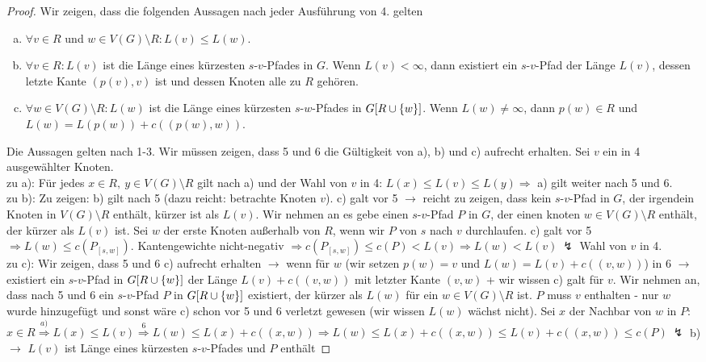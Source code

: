 \begin{proof}
	Wir zeigen, dass die folgenden Aussagen nach jeder Ausführung von 4. gelten
	\begin{enumerate}[a)]
		\item $\forall v\in R$ und $w\in V(G)\setminus R: L(v) \le L(w)$.
		\item $\forall v\in R: L(v)$ ist die Länge eines kürzesten $s$-$v$-Pfades in $G$. Wenn $L(v) < \infty$, dann existiert ein $s$-$v$-Pfad der Länge $L(v)$, dessen letzte Kante $(p(v), v)$ ist und dessen Knoten alle zu $R$ gehören.
		\item $\forall w\in V(G)\setminus R: L(w)$ ist die Länge eines kürzesten $s$-$w$-Pfades in $G[R\cup \{w\}]$. Wenn $L(w) \neq \infty$, dann $p(w)\in R$ und $L(w) = L(p(w)) + c((p(w),w))$.
	\end{enumerate}
	Die Aussagen gelten nach 1-3. Wir müssen zeigen, dass 5 und 6 die Gültigkeit von a), b) und c) aufrecht erhalten. Sei $v$ ein in 4 ausgewählter Knoten.\\
	zu a): Für jedes $x \in R,~y\in V(G)\setminus R$ gilt nach a) und der Wahl von $v$ in 4: $L(x) \le L(v) \le L(y) \Rightarrow$ a) gilt weiter nach 5 und 6.\\
	zu b): Zu zeigen: b) gilt nach 5 (dazu reicht: betrachte Knoten $v$). c) galt vor 5 $\to$ reicht zu zeigen, dass kein $s$-$v$-Pfad in $G$, der irgendein Knoten in $V(G)\setminus R$ enthält, kürzer ist als $L(v)$. Wir nehmen an es gebe einen $s$-$v$-Pfad $P$ in $G$, der einen knoten $w \in V(G)\setminus R$ enthält, der kürzer als $L(v)$ ist. Sei $w$ der erste Knoten außerhalb von $R$, wenn wir $P$ von $s$ nach $v$ durchlaufen. c) galt vor 5 $\Rightarrow L(w) \le c(P_{[s,w]})$. Kantengewichte nicht-negativ $\Rightarrow c(P_{[s,w]}) \le c(P) < L(v) \Rightarrow L(w) < L(v)~ \lightning$ Wahl von $v$ in 4.\\
	zu c): Wir zeigen, dass 5 und 6 c) aufrecht erhalten $\to$ wenn für $w$ (wir setzen $p(w) = v$ und $L(w) = L(v) + c((v,w))$) in 6 $\to$ existiert ein $s$-$v$-Pfad in $G[R \cup \{w\}]$ der Länge $L(v) + c((v,w))$ mit letzter Kante $(v,w)$ + wir wissen c) galt für $v$. Wir nehmen an, dass nach 5 und 6 ein $s$-$v$-Pfad $P$ in $G[R \cup \{w\}]$ existiert, der kürzer als $L(w)$ für ein $w\in V(G)\setminus R$ ist. $P$ muss $v$ enthalten - nur $w$ wurde hinzugefügt und sonst wäre c) schon vor 5 und 6 verletzt gewesen (wir wissen $L(w)$ wächst nicht). Sei $x$ der Nachbar von $w$ in $P$: $x \in R \overset{a)}{\Rightarrow} L(x) \le L(v) \overset{6}{\Rightarrow} L(w) \le L(x) + c((x,w)) \Rightarrow L(w) \le L(x) + c((x,w)) \le L(v) + c((x,w)) \le c(P) ~\lightning$ b) $\to$ $L(v)$ ist Länge eines kürzesten $s$-$v$-Pfades und $P$ enthält

\end{proof}
